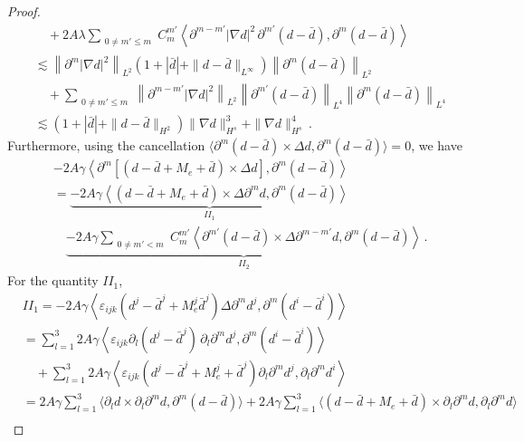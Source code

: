 \documentclass[reqno,11pt]{amsart}
\numberwithin{equation}{section}
\def\p{\partial}
\begin{document}
\begin{proof}
\begin{equation}
\begin{aligned}
&\quad + 2A\lambda \sum_{\substack{0 \neq m' \leq m}} C_m^{m'} \left\langle \partial^{m - m'} |\nabla d|^2 \, \partial^{m'} (d - \bar{d}), \partial^m (d - \bar{d}) \right\rangle \\
&\lesssim \left\| \partial^m |\nabla d|^2 \right\|_{L^2} \left( 1 + |\bar{d}| + \|d - \bar{d}\|_{L^\infty} \right) \left\| \partial^m (d - \bar{d}) \right\|_{L^2} \\
&\quad + \sum_{\substack{0 \neq m' \leq m}} \left\| \partial^{m - m'} |\nabla d|^2 \right\|_{L^2} \left\| \partial^{m'} (d - \bar{d}) \right\|_{L^4} \left\| \partial^m (d - \bar{d}) \right\|_{L^4} \\
&\lesssim \left( 1 + |\bar{d}| + \|d - \bar{d}\|_{H^2} \right) \|\nabla d\|_{H^s}^3 + \|\nabla d\|_{H^s}^4 \,.
\end{aligned}
\end{equation}
Furthermore, using the cancellation $\langle \p^m(d-\bar{d})\times\Delta d,\p^m(d-\bar{d})\rangle = 0 $, we have
\begin{align*}
&- 2A\gamma \left\langle \partial^m \left[ \left(d - \bar{d} +M_e +\bar{d}\right) \times \Delta d \right], \partial^m (d - \bar{d}) \right\rangle \\
&= \underset{II_1}{\underbrace{-2A\gamma \left\langle \left(d - \bar{d} +M_e +\bar{d}\right) \times \Delta \partial^m d, \partial^m (d - \bar{d}) \right\rangle}} \\
&\quad\underset{II_2}{\underbrace{ - 2A\gamma \sum_{\substack{0 \neq m' < m}} C_m^{m'} \left\langle \partial^{m'} (d - \bar{d}) \times \Delta \partial^{m - m'} d, \partial^m (d - \bar{d}) \right\rangle}} \,.
\end{align*}
For the quantity $II_1$,
\begin{equation*}
\begin{aligned}
&II_1= -2A\gamma \left\langle \varepsilon_{ijk}\left(d^j - \bar{d}^j +M_e^j \bar{d}^j\right) \Delta \partial^m d^j, \partial^m (d^i - \bar{d}^i) \right\rangle \\
&= \sum_{l=1}^3 2A\gamma \left\langle \varepsilon_{ijk} \partial_l (d^j - \bar{d}^j) \, \partial_l \partial^m d^j, \partial^m (d^i - \bar{d}^i) \right\rangle \\
&\quad + \sum_{l=1}^3 2A\gamma \left\langle \varepsilon_{ijk} \left(d^j - \bar{d}^j +M_e^j+ \bar{d}^j\right) \partial_l \partial^m d^j, \partial_l \partial^m d^i \right\rangle\\&
= 2A\gamma  \sum_{l=1}^3 \langle \p_l d \times \p_l \partial^m d, \partial^m (d - \bar{d}) \rangle + 2A \gamma \sum_{l=1}^3 \langle (d - \bar{d} +M_e + \bar{d}) \times \partial_l \partial^m d, \p_l \partial^m d \rangle \\

\end{aligned}
\end{equation*}
\end{proof}
\end{document}
